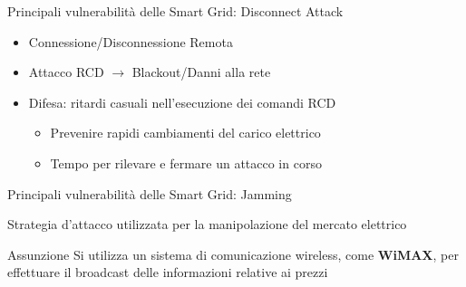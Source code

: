 
\begin{frame}{Principali vulnerabilità delle Smart Grid: Disconnect Attack}
	\begin{itemize}[<+- | alert@+>]
		\item Connessione/Disconnessione Remota
		\item Attacco RCD $\rightarrow$ Blackout/Danni alla rete
		\item Difesa: ritardi casuali nell'esecuzione dei comandi RCD
		\begin{itemize}
			\item Prevenire rapidi cambiamenti del carico elettrico
			\item Tempo per rilevare e fermare un attacco in corso
		\end{itemize}
	\end{itemize}
\end{frame}


\begin{frame}{Principali vulnerabilità delle Smart Grid: Jamming}
	\begin{block}{}
	Strategia d'attacco utilizzata per la manipolazione del mercato elettrico
	\end{block}
	\pause
	\begin{block}{Assunzione}
	Si utilizza un sistema di comunicazione wireless, come \textbf{\color{blue_slides}WiMAX}, per effettuare il broadcast delle informazioni relative ai prezzi
	\end{block}
\end{frame}

